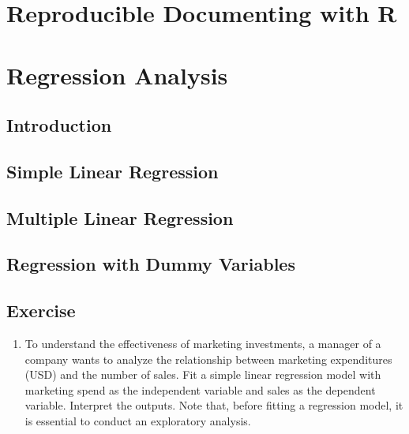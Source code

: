 \documentclass[
  letterpaper,
  DIV=11,
  numbers=noendperiod]{scrreprt}
\providecommand{\tightlist}{%
  \setlength{\itemsep}{0pt}\setlength{\parskip}{0pt}}\usepackage{longtable,booktabs,array}
\begin{document}

\chapter{Reproducible Documenting with
R}\label{reproducible-documenting-with-r}


\chapter{Regression Analysis}\label{regression-analysis}

\section{Introduction}\label{introduction}

\section{Simple Linear Regression}\label{simple-linear-regression}

\section{Multiple Linear Regression}\label{multiple-linear-regression}

\section{Regression with Dummy
Variables}\label{regression-with-dummy-variables}

\section{Exercise}\label{exercise-10}

\begin{enumerate}
\def\labelenumi{\arabic{enumi}.}
\tightlist
\item
  To understand the effectiveness of marketing investments, a manager of
  a company wants to analyze the relationship between marketing
  expenditures (USD) and the number of sales. Fit a simple linear
  regression model with marketing spend as the independent variable and
  sales as the dependent variable. Interpret the outputs. Note that,
  before fitting a regression model, it is essential to conduct an
  exploratory analysis.
\end{enumerate}
\end{document}
